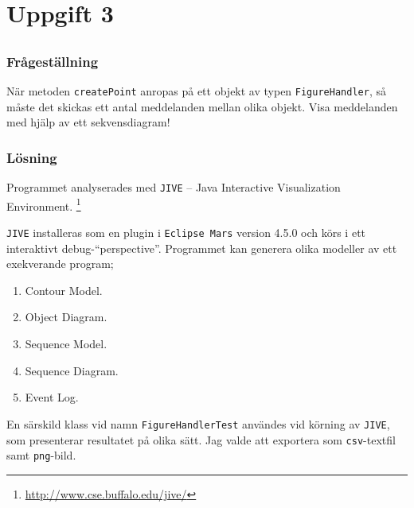 %
%

\section{Uppgift 3}\label{sec:uppg3}

\subsection{}\label{sec:uppg3a}
\subsubsection*{Frågeställning}
När metoden \texttt{createPoint} anropas på ett objekt av typen
\texttt{FigureHandler}, så måste det skickas ett antal meddelanden mellan olika
objekt. Visa meddelanden med hjälp av ett sekvensdiagram!

\subsubsection*{Lösning}
Programmet analyserades med \texttt{JIVE} -- Java Interactive
Visualization Environment. \footnote{\url{http://www.cse.buffalo.edu/jive/}}

\texttt{JIVE} installeras som en plugin i \texttt{Eclipse Mars} version 4.5.0
och körs i ett interaktivt debug-``perspective''. Programmet kan generera olika
modeller av ett exekverande program;

\begin{enumerate}
\item Contour Model.
\item Object Diagram.
\item Sequence Model.
\item Sequence Diagram.
\item Event Log.
\end{enumerate}

En särskild klass vid namn \texttt{FigureHandlerTest} användes vid körning av
\texttt{JIVE}, som presenterar resultatet på olika sätt. Jag valde att
exportera som \texttt{csv}-textfil samt \texttt{png}-bild.

